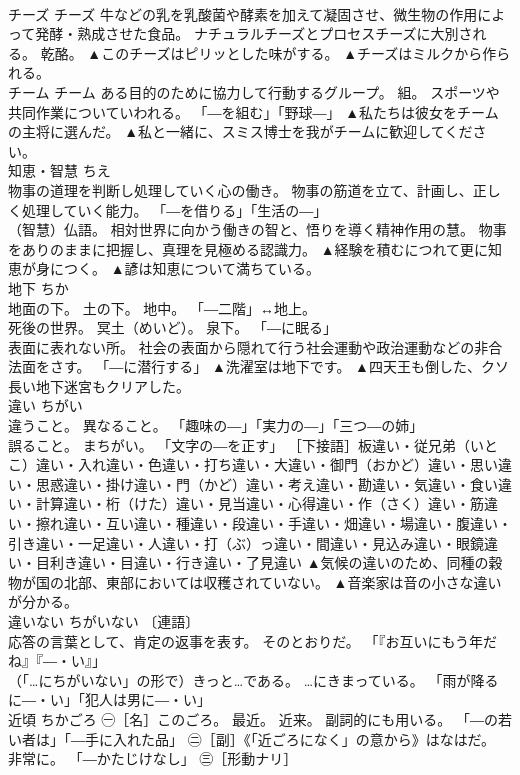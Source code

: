 \documentclass[8pt]{extreport}
\begin{document}
\begin{CJK}{UTF8}{min}
\\	チーズ	チーズ	牛などの乳を乳酸菌や酵素を加えて凝固させ、微生物の作用によって発酵・熟成させた食品。 ナチュラルチーズとプロセスチーズに大別される。 乾酪。	▲このチーズはピリッとした味がする。 ▲チーズはミルクから作られる。
\\	チーム	チーム	ある目的のために協力して行動するグループ。 組。 スポーツや共同作業についていわれる。 「―を組む」「野球―」	▲私たちは彼女をチームの主将に選んだ。 ▲私と一緒に、スミス博士を我がチームに歓迎してください。
\\	知恵・智慧	ちえ	
\\	物事の道理を判断し処理していく心の働き。 物事の筋道を立て、計画し、正しく処理していく能力。 「―を借りる」「生活の―」 
\\	（智慧）仏語。 相対世界に向かう働きの智と、悟りを導く精神作用の慧。 物事をありのままに把握し、真理を見極める認識力。	▲経験を積むにつれて更に知恵が身につく。 ▲諺は知恵について満ちている。
\\	地下	ちか	
\\	地面の下。 土の下。 地中。 「―二階」↔地上。 
\\	死後の世界。 冥土（めいど）。 泉下。 「―に眠る」 
\\	表面に表れない所。 社会の表面から隠れて行う社会運動や政治運動などの非合法面をさす。 「―に潜行する」	▲洗濯室は地下です。 ▲四天王も倒した、クソ長い地下迷宮もクリアした。
\\	違い	ちがい	
\\	違うこと。 異なること。 「趣味の―」「実力の―」「三つ―の姉」 
\\	誤ること。 まちがい。 「文字の―を正す」 ［下接語］板違い・従兄弟（いとこ）違い・入れ違い・色違い・打ち違い・大違い・御門（おかど）違い・思い違い・思惑違い・掛け違い・門（かど）違い・考え違い・勘違い・気違い・食い違い・計算違い・桁（けた）違い・見当違い・心得違い・作（さく）違い・筋違い・擦れ違い・互い違い・種違い・段違い・手違い・畑違い・場違い・腹違い・引き違い・一足違い・人違い・打（ぶ）っ違い・間違い・見込み違い・眼鏡違い・目利き違い・目違い・行き違い・了見違い	▲気候の違いのため、同種の穀物が国の北部、東部においては収穫されていない。 ▲音楽家は音の小さな違いが分かる。
\\	違いない	ちがいない	〔連語〕 
\\	応答の言葉として、肯定の返事を表す。 そのとおりだ。 「『お互いにもう年だね』『―・い』」 
\\	（「…にちがいない」の形で）きっと…である。 …にきまっている。 「雨が降るに―・い」「犯人は男に―・い」	
\\	近頃	ちかごろ	㊀［名］このごろ。 最近。 近来。 副詞的にも用いる。 「―の若い者は」「―手に入れた品」 ㊁［副］《「近ごろになく」の意から》はなはだ。 非常に。 「―かたじけなし」 ㊂［形動ナリ］ 

\end{CJK}
\end{document}
